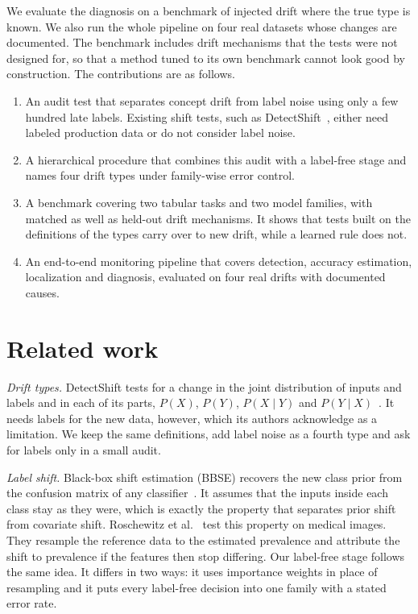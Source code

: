 \documentclass[pdflatex,sn-mathphys-num]{sn-jnl}
\begin{document}
We evaluate the diagnosis on a benchmark of injected drift where the true type is known. We also run the whole pipeline on four real datasets whose changes are documented. The benchmark includes drift mechanisms that the tests were not designed for, so that a method tuned to its own benchmark cannot look good by construction. The contributions are as follows.

\begin{enumerate}
\item An audit test that separates concept drift from label noise using only a few hundred late labels. Existing shift tests, such as DetectShift~\cite{maiapolo2023detectshift}, either need labeled production data or do not consider label noise.
\item A hierarchical procedure that combines this audit with a label-free stage and names four drift types under family-wise error control.
\item A benchmark covering two tabular tasks and two model families, with matched as well as held-out drift mechanisms. It shows that tests built on the definitions of the types carry over to new drift, while a learned rule does not.
\item An end-to-end monitoring pipeline that covers detection, accuracy estimation, localization and diagnosis, evaluated on four real drifts with documented causes.
\end{enumerate}

\section{Related work}\label{sec:sota}

\emph{Drift types.} DetectShift tests for a change in the joint distribution of inputs and labels and in each of its parts, $P(X)$, $P(Y)$, $P(X\mid Y)$ and $P(Y\mid X)$~\cite{maiapolo2023detectshift}. It needs labels for the new data, however, which its authors acknowledge as a limitation. We keep the same definitions, add label noise as a fourth type and ask for labels only in a small audit.

\emph{Label shift.} Black-box shift estimation (BBSE) recovers the new class prior from the confusion matrix of any classifier~\cite{lipton2018bbse}. It assumes that the inputs inside each class stay as they were, which is exactly the property that separates prior shift from covariate shift. Roschewitz et al.~\cite{roschewitz2025shiftid} test this property on medical images. They resample the reference data to the estimated prevalence and attribute the shift to prevalence if the features then stop differing. Our label-free stage follows the same idea. It differs in two ways: it uses importance weights in place of resampling and it puts every label-free decision into one family with a stated error rate.
\end{document}
